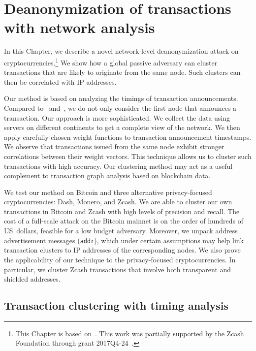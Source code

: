 \chapter{Deanonymization of transactions with network analysis} %

\label{Chapter03Clustering}

In this Chapter, we describe a novel network-level deanonymization attack on cryptocurrencies.\footnote{This Chapter is based on~\cite{Biryukov2019a, Biryukov2019b}. This work was partially supported by the Zcash Foundation through grant 2017Q4-24~\cite{Feher2017}.}
We show how a global passive adversary can cluster transactions that are likely to originate from the same node.
Such clusters can then be correlated with IP addresses.

Our method is based on analyzing the timings of transaction announcements.
Compared to~\cite{Biryukov2014} and~\cite{Koshy2014}, we do not only consider the first node that announces a transaction.
Our approach is more sophisticated.
We collect the data using servers on different continents to get a complete view of the network.
We then apply carefully chosen weight functions to transaction announcement timestamps.
We observe that transactions issued from the same node exhibit stronger correlations between their weight vectors.
This technique allows us to cluster such transactions with high accuracy.
Our clustering method may act as a useful complement to transaction graph analysis based on blockchain data.

We test our method on Bitcoin and three alternative privacy-focused cryptocurrencies: Dash, Monero, and Zcash.
We are able to cluster our own transactions in Bitcoin and Zcash with high levels of precision and recall.
The cost of a full-scale attack on the Bitcoin mainnet is on the order of hundreds of US~dollars, feasible for a low budget adversary.
Moreover, we unpack address advertisement messages (\texttt{addr}), which under certain assumptions may help link transaction clusters to IP addresses of the corresponding nodes.
We also prove the applicability of our technique to the privacy-focused cryptocurrencies.
In particular, we cluster Zcash transactions that involve both transparent and shielded addresses.


\section{Transaction clustering with timing analysis}  \label{sec:Ch03Ourapproach}

